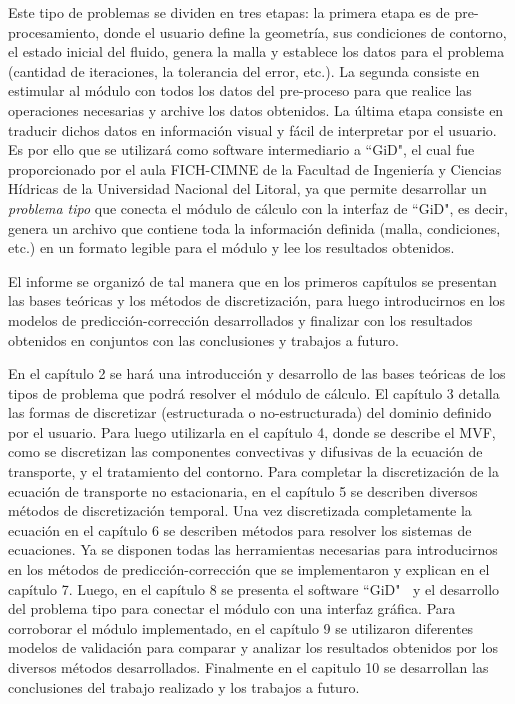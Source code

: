 \documentclass[a4paper,10pt, oneside]{book}
\begin{document}
Este tipo de problemas se dividen en tres etapas: la primera etapa es de pre-procesamiento, donde el usuario define la geometría, sus condiciones de contorno, el estado inicial del fluido, genera la malla y establece los datos para el problema (cantidad de iteraciones, la tolerancia del error, etc.). La segunda consiste en estimular al módulo con todos los datos del pre-proceso para que realice las operaciones necesarias y archive los datos obtenidos. La última etapa consiste en traducir dichos datos en información visual y fácil de interpretar por el usuario. Es por ello que se utilizará como software intermediario a ``GiD", el cual fue proporcionado por el aula FICH-CIMNE de la Facultad de Ingeniería y Ciencias Hídricas de la Universidad Nacional del Litoral, ya que permite desarrollar un \textit{problema tipo} que conecta el módulo de cálculo con la interfaz de ``GiD", es decir, genera un archivo que contiene toda la información definida (malla, condiciones, etc.) en un formato legible para el módulo y lee los resultados obtenidos.

El informe se organizó de tal manera que en los primeros capítulos se presentan las bases teóricas y los métodos de discretización, para luego introducirnos en los modelos de predicción-corrección desarrollados y finalizar con los resultados obtenidos en conjuntos con las conclusiones y trabajos a futuro.

En el capítulo 2 se hará una introducción y desarrollo de las bases teóricas de los tipos de problema que podrá resolver el módulo de cálculo. El capítulo 3 detalla las formas de discretizar (estructurada o no-estructurada) del dominio definido por el usuario. Para luego utilizarla en el capítulo 4, donde se describe el MVF, como se discretizan las componentes convectivas y difusivas de la ecuación de transporte, y el tratamiento del contorno. Para completar la discretización de la ecuación de transporte no estacionaria, en el capítulo 5 se describen diversos métodos de discretización temporal. Una vez discretizada completamente la ecuación en el capítulo 6 se describen métodos para resolver los sistemas de ecuaciones. Ya se disponen todas las herramientas necesarias para introducirnos en los métodos de predicción-corrección que se implementaron y explican en el capítulo 7. Luego, en el capítulo 8 se presenta el software ``GiD" $~$ y el desarrollo del problema tipo para conectar el módulo con una interfaz gráfica. Para corroborar el módulo implementado, en el capítulo 9 se utilizaron diferentes modelos de validación para comparar y analizar los resultados obtenidos por los diversos métodos desarrollados. Finalmente en el capitulo 10 se desarrollan las conclusiones del trabajo realizado y los trabajos a futuro.
\end{document}
